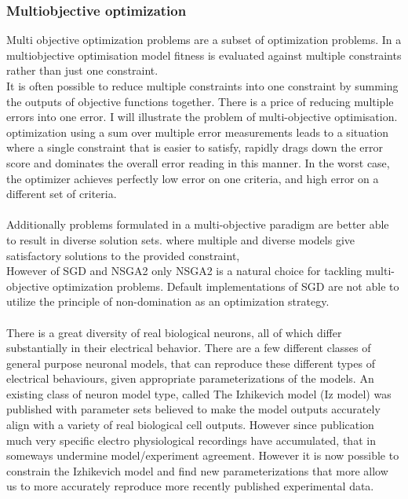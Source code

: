 \subsubsection{Multiobjective optimization} Multi objective optimization problems are a subset of optimization problems. In a multiobjective optimisation model fitness is evaluated against multiple constraints rather than just one constraint. 
\\
It is often possible to reduce multiple constraints into one constraint by summing the outputs of objective functions together. There is a price of reducing multiple errors into one error. I will illustrate the problem of multi-objective optimisation. optimization using a sum over multiple error measurements leads to a situation where a single constraint that is easier to satisfy, rapidly drags down the error score and dominates the overall error reading in this manner. In the worst case, the optimizer achieves perfectly low error on one criteria, and high error on a different set of criteria.\\
\\
Additionally problems formulated in a multi-objective paradigm are better able to result in diverse solution sets. where multiple and diverse models give satisfactory solutions to the provided constraint, 
\\
However of SGD and NSGA2 only NSGA2 is a natural choice for tackling multi-objective optimization problems. Default implementations of SGD are not able to utilize the principle of non-domination as an optimization strategy.\\
\\
There is a great diversity of real biological neurons, all of which differ substantially in their electrical behavior. There are a few different classes of general purpose neuronal models, that can reproduce these different types of electrical behaviours, given appropriate parameterizations of the models.\newline
\newline
An existing class of neuron model type, called The Izhikevich model \cite{izhikevich2003simple} (Iz model) was published with parameter sets believed to make the model outputs accurately align with a variety of real biological cell outputs. However since publication much very specific electro physiological recordings have accumulated, that in someways undermine model/experiment agreement. However it is now possible to constrain the Izhikevich model and find new parameterizations that more allow us to more accurately reproduce more recently published experimental data.\newline
\newline

